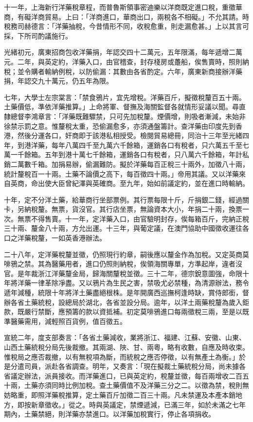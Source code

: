 \begin{pinyinscope}
十一年，上海新行洋藥稅章程，而普魯斯領事密迪樂以洋商既定進口稅，重徵華商，有礙洋商貿易。上曰：「洋商進口，華商出口，兩稅各不相礙。」不允其請。時稅務司赫德言：「洋藥抽稅，今昔情形不同，收稅愈重，則走漏愈甚。」上以其言可採，下所司酌議施行。

光緒初元，廣東招商包收洋藥捐，年認交四十二萬元，五年限滿，每年遞增二萬元。二年，與英定約，洋藥入口，由官稽查，封存棧房或躉船，俟售賣時，照則納稅；並令購者輸納例稅，以防偷漏：其數由各省酌定。六年，廣東新商接辦洋藥捐，年認交九十萬元，仍五年為限。

七年，大學士左宗棠言：「禁食鴉片，宜先增稅。洋藥百斤，擬徵稅釐百五十兩。土藥價低，準依洋藥推算。」上命將軍、督撫及海關監督各就情形妥議以聞。尋直隸總督李鴻章言：「洋藥既難驟禁，只可先加稅釐。煙價增，則吸者漸減，未始非徐禁示罰之意。惟釐稅太重，恐偷漏愈多，亦須通盤籌計。查洋藥由印度先到香港，然後分運各口，奸商即于該港私相授受。檢閱貿易總冊，同治十三年至光緒四年，到港洋藥，每年八萬四千至九萬六千餘箱，運銷各口有稅者，只六萬五千至七萬一千餘箱。五年到港十萬七千餘箱，運銷各口有稅者，只八萬六千餘箱，年計私銷二萬數千箱。加捐易辦，偷漏難防。擬於洋藥每百正稅三十兩外，加徵八十兩，統計釐稅百一十兩。土藥不論價之高下，每百徵四十兩。」帝用其議。又以洋藥來自英商，命出使大臣曾紀澤與英確商。至九年，始如前議定約，並在進口時輸納。

十年，定不分洋土藥，給華商行坐部票例。其行票每限十斤，斤捐銀二錢，經過關卡，另納稅釐。無票，貨沒官。其行店坐票，無論資本大小，年捐二十兩，換票一次。無票不得售賣。十一年，定洋藥入口，由官驗明封存，俟每箱百斤，完納正稅三十兩、釐金八十兩，方允出運。十三年，與葡定議，在澳門協助中國徵收運往各口之洋藥稅釐，一如英香港辦法。

二十八年，定洋藥稅釐並徵，仍照現行約章，嗣後應以釐金作為加稅。又定英商莫啡鴉之禁。其為醫藥用者，進口仍照則納稅，俟領海關專單，方準起岸，違者沒官。是年裁浙江洋藥釐金局，歸海關釐稅並徵。三十二年，德宗銳意圖強，命限十年將洋藥一律革除凈盡。又以鴉片為生民之害，禁吸尤必禁種，為清源辦法，務令遞年減種，統限十年將洋土藥盡絕根株。是年開廣西巡撫柯逢時缺，賞侍郎銜，督辦各省土藥統稅，設總局於湖北，各省並設分局。逾年，以洋土兩藥稅釐為歲入鉅款，既嚴行禁斷，應預籌的款以資抵補。初定莫啡鴉進口每兩徵稅三兩，至是以既準醫藥需用，減輕照百貨例，值百徵五。

宣統二年，度支部奏言：「各省土藥減收，業將浙江、福建、江蘇、安徽、山東、山西土藥統稅分局先後裁撤。其兩湖、陜、甘、兩粵，略有收數，自應及時收束。惟稅局之應否裁撤，以有無稅項為斷，而統稅之應否停徵，以有無產土為衡。」於是分遣司員，派赴各省調查。明年，又奏言：「現在擬裁土藥統稅分局，尚未據各省議定辦法，派員接收。而洋藥進口，已與英定約，稅釐並徵，每百兩增收二百五十兩，土藥亦須同時比例加稅。查土藥價值不及洋藥三分之二。以徵為禁，稅則無妨略重，即照洋藥稅推算，定土藥百斤加徵二百三十兩。凡未禁運及本產本銷地方，即按新章徵收。」從之。時與英議定，禁煙遞減，已滿三年，如於未滿之七年期內，土藥禁絕，則洋藥亦禁進口。以洋藥加稅實行，停止各項捐收。


\end{pinyinscope}
